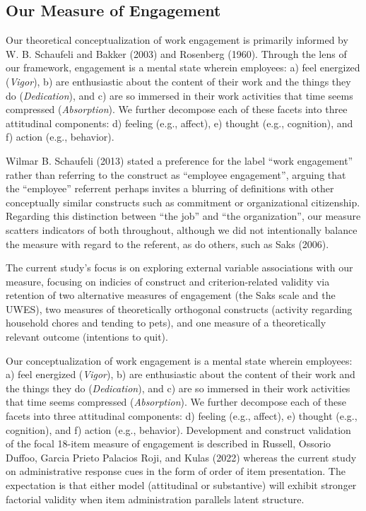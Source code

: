 \documentclass[
  man]{apa6}
\begin{document}
\hypertarget{our-measure-of-engagement}{%
\subsection{Our Measure of Engagement}\label{our-measure-of-engagement}}

Our theoretical conceptualization of work engagement is primarily informed by W. B. Schaufeli and Bakker (2003) and Rosenberg (1960). Through the lens of our framework, engagement is a mental state wherein employees: a) feel energized (\emph{Vigor}), b) are enthusiastic about the content of their work and the things they do (\emph{Dedication}), and c) are so immersed in their work activities that time seems compressed (\emph{Absorption}). We further decompose each of these facets into three attitudinal components: d) feeling (e.g., affect), e) thought (e.g., cognition), and f) action (e.g., behavior).

Wilmar B. Schaufeli (2013) stated a preference for the label ``work engagement'' rather than referring to the construct as ``employee engagement'', arguing that the ``employee'' referrent perhaps invites a blurring of definitions with other conceptually similar constructs such as commitment or organizational citizenship. Regarding this distinction between ``the job'' and ``the organization'', our measure scatters indicators of both throughout, although we did not intentionally balance the measure with regard to the referent, as do others, such as Saks (2006).

The current study's focus is on exploring external variable associations with our measure, focusing on indicies of construct and criterion-related validity via retention of two alternative measures of engagement (the Saks scale and the UWES), two measures of theoretically orthogonal constructs (activity regarding household chores and tending to pets), and one measure of a theoretically relevant outcome (intentions to quit).

Our conceptualization of work engagement is a mental state wherein employees: a) feel energized (\emph{Vigor}), b) are enthusiastic about the content of their work and the things they do (\emph{Dedication}), and c) are so immersed in their work activities that time seems compressed (\emph{Absorption}). We further decompose each of these facets into three attitudinal components: d) feeling (e.g., affect), e) thought (e.g., cognition), and f) action (e.g., behavior). Development and construct validation of the focal 18-item measure of engagement is described in Russell, Ossorio Duffoo, Garcia Prieto Palacios Roji, and Kulas (2022) whereas the current study on administrative response cues in the form of order of item presentation. The expectation is that either model (attitudinal or substantive) will exhibit stronger factorial validity when item administration parallels latent structure.
\end{document}
